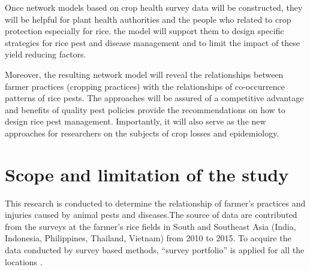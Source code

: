Once network models based on crop health survey data will be constructed, they will be helpful for plant health authorities and the people who related to crop protection especially for rice. the model will support them to design specific strategies for rice pest and disease management and to limit the impact of these yield reducing factors.

Moreover, the resulting network model will reveal the relationships between farmer practices (cropping practices) with the relationships of co-occurrence patterns of rice pests. The approaches will be assured of a competitive advantage and benefits of quality pest policies provide the recommendations on how to design rice pest management. Importantly, it will also serve as the new approaches for researchers on the subjects of crop losses  and epidemiology.


\section*{Scope and limitation of the study}
This research is conducted to determine the relationship of farmer's practices and injuries caused by animal pests and diseases.The source of data are contributed from the surveys at the farmer's rice fields in South and Southeast Asia (India, Indonesia, Philippines, Thailand, Vietnam) from 2010 to 2015. To acquire the data conducted by survey based methods, ``survey portfolio'' is applied for all the locations \citep{Savarysurvey2009}.

